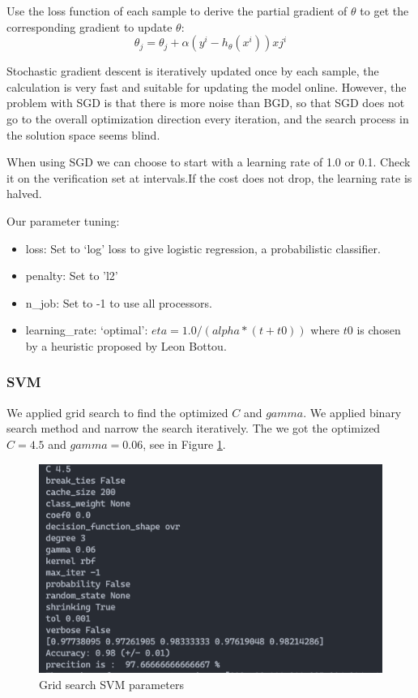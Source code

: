 \documentclass[11pt,en]{elegantpaper}
\begin{document}
Use the loss function of each sample to derive the partial gradient of $\theta$ to get the corresponding gradient to update $\theta$:
$$\theta_{j} = \theta_{j} + \alpha(y^i - h_{\theta}(x^i))x{j}^{i}$$

Stochastic gradient descent is iteratively updated once by each sample, the calculation is very fast and suitable for updating the model online. However, the problem with SGD is that there is more noise than BGD, so that SGD does not go to the overall optimization direction every iteration, and the search process in the solution space seems blind. 

When using SGD we can choose to start with a learning rate of 1.0 or 0.1. Check it on the verification set at intervals.If the cost does not drop, the learning rate is halved.

Our parameter tuning:
\begin{itemize}
	\item loss: Set to ‘log’ loss to give logistic regression, a probabilistic classifier. 
	\item penalty: Set to 'l2'
	\item n\_job: Set to -1 to use all processors.
	\item learning\_rate: ‘optimal’: $eta = 1.0 / (alpha * (t + t0))$ where $t0$ is chosen by a heuristic proposed by Leon Bottou\cite{bottou2003stochastic}.
\end{itemize}

\subsubsection{SVM}
We applied grid search to find the optimized $C$ and $gamma$. We applied binary search method and  narrow the search iteratively. The we got the optimized $C=4.5$ and $gamma=0.06$, see in Figure \ref{bestsvm}.

\begin{figure}[h]
	\centering
	\includegraphics[width=.5\textwidth]{image/bestsvm}
	\caption{Grid search SVM parameters}
	\label{bestsvm}
\end{figure}
\end{document}

